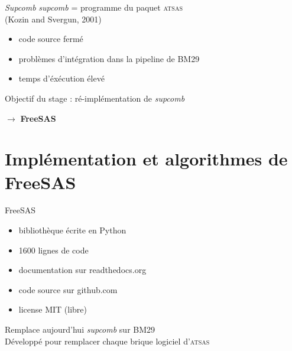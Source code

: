 \documentclass{beamer}
\begin{document}
\begin{frame}{\textit{Supcomb}}
\textit{supcomb} = programme du paquet \textsc{atsas}\\
(Kozin and Svergun, 2001)
\begin{itemize}
  \item code source ferm\'e
  \item probl\`emes d'int\'egration dans la pipeline de BM29
  \item temps d'\'ex\'ecution \'elev\'e
\end{itemize}

\vspace{1cm}

Objectif du stage : r\'e-impl\'ementation de \textit{supcomb}\\
\begin{center} $\longrightarrow$ \textbf{FreeSAS} \end{center}

\end{frame}

\section{Impl\'ementation et algorithmes de FreeSAS}

\begin{frame}{FreeSAS}

\begin{itemize}
\item biblioth\`eque \'ecrite en Python
\item 1600 lignes de code
\item documentation sur readthedocs.org
\item code source sur github.com
\item license MIT (libre)
\end{itemize}

Remplace aujourd'hui \textit{supcomb} sur BM29\\
D\'evelopp\'e pour remplacer chaque brique logiciel d'\textsc{atsas}

\end{frame}
\end{document}
